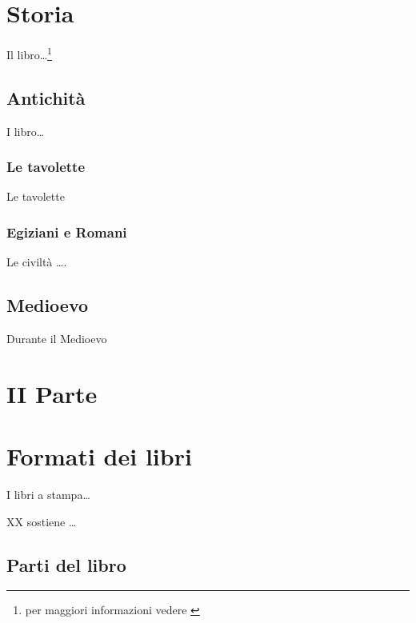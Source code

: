 \documentclass[
]{book}
\begin{document}
\hypertarget{storia}{%
\chapter{Storia}\label{storia}}

Il libro\ldots{}\footnote{per maggiori informazioni vedere \citet{Book}}

\hypertarget{antichituxe0}{%
\section{Antichità}\label{antichituxe0}}

I libro\ldots{}

\hypertarget{le-tavolette}{%
\subsection{Le tavolette}\label{le-tavolette}}

Le tavolette

\hypertarget{egiziani-e-romani}{%
\subsection{Egiziani e Romani}\label{egiziani-e-romani}}

Le civiltà \ldots.

\hypertarget{medioevo}{%
\section{Medioevo}\label{medioevo}}

Durante il Medioevo

\hypertarget{ii-parte}{%
\chapter*{II Parte}\label{ii-parte}}

\hypertarget{formati-dei-libri}{%
\chapter{Formati dei libri}\label{formati-dei-libri}}

I libri a stampa\ldots{}

XX sostiene \ldots{} \citet{Illibro}

\hypertarget{parti-del-libro}{%
\section{Parti del libro}\label{parti-del-libro}}
\end{document}
